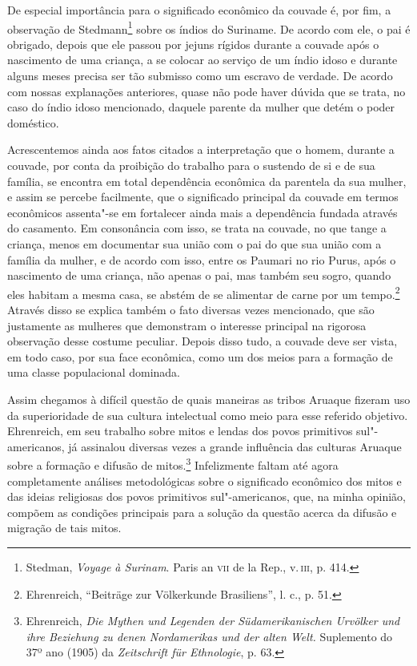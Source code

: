 De especial importância para o significado econômico da couvade é, por
fim, a observação de Stedmann\footnote{Stedman, \emph{Voyage à Surinam}.
  Paris an \textsc{vii} de la Rep., v.\,\textsc{iii}, p. 414.} sobre os índios do
Suriname. De acordo com ele, o pai é obrigado, depois que ele passou por
jejuns rígidos durante a couvade após o nascimento de uma criança, a se
colocar ao serviço de um índio idoso e durante alguns meses precisa ser
tão submisso como um escravo de verdade. De acordo com nossas
explanações anteriores, quase não pode haver dúvida que se trata, no
caso do índio idoso mencionado, daquele parente da mulher que detém o
poder doméstico.

Acrescentemos ainda aos fatos citados a interpretação que o homem,
durante a couvade, por conta da proibição do trabalho para o sustendo
de si e de sua família, se encontra em total dependência econômica da
parentela da sua mulher, e assim se percebe facilmente, que o
significado principal da couvade em termos econômicos assenta"-se em
fortalecer ainda mais a dependência fundada através do casamento. Em
consonância com isso, se trata na couvade, no que tange a criança, menos
em documentar sua união com o pai do que sua união com a família da
mulher, e de acordo com isso, entre os Paumari no rio Purus, após o
nascimento de uma criança, não apenas o pai, mas também seu sogro,
quando eles habitam a mesma casa, se abstém de se alimentar de carne por
um tempo.\footnote{Ehrenreich, ``Beiträge zur Völkerkunde Brasiliens'',
  l. c., p. 51.} Através disso se explica também o fato diversas vezes
mencionado, que são justamente as mulheres que demonstram o interesse
principal na rigorosa observação desse costume peculiar. Depois disso
tudo, a couvade deve ser vista, em todo caso, por sua face econômica,
como um dos meios para a formação de uma classe populacional dominada.

Assim chegamos à difícil questão de quais maneiras as tribos Aruaque
fizeram uso da superioridade de sua cultura intelectual como meio para
esse referido objetivo. Ehrenreich, em seu trabalho sobre mitos e lendas
dos povos primitivos sul"-americanos, já assinalou diversas vezes a
grande influência das culturas Aruaque sobre a formação e difusão de
mitos.\footnote{Ehrenreich, \emph{Die Mythen und Legenden der
  Südamerikanischen Urvölker und ihre Beziehung zu denen Nordamerikas
  und der alten Welt.} Suplemento do 37º ano (1905) da \emph{Zeitschrift
  für Ethnologie}, p. 63.} Infelizmente faltam até agora completamente
análises metodológicas sobre o significado econômico dos mitos e das
ideias religiosas dos povos primitivos sul"-americanos, que, na minha
opinião, compõem as condições principais para a solução da questão
acerca da difusão e migração de tais mitos.

